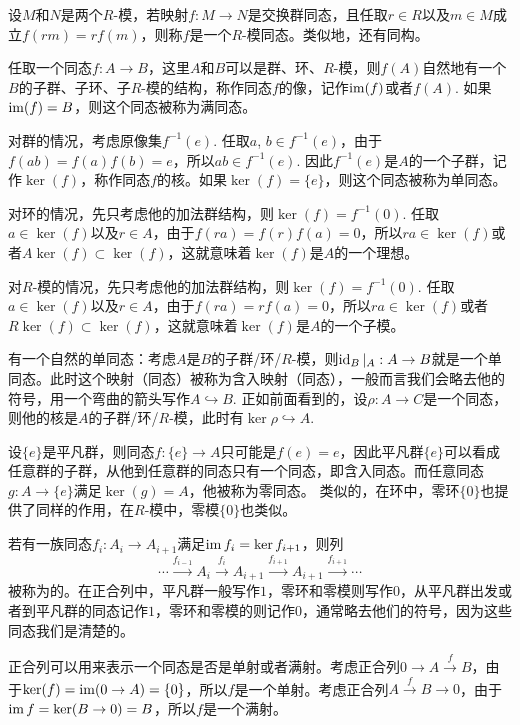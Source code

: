 设$M$和$N$是两个$R$-模，若映射$f:M\to N$是交换群同态，且任取$r\in R$以及$m\in M$成立$f(rm)=rf(m)$，则称$f$是一个$R$-模同态。类似地，还有同构。

\para[像与核] 任取一个同态$f:A\to B$，这里$A$和$B$可以是群、环、$R$-模，则$f(A)$自然地有一个$B$的子群、子环、子$R$-模的结构，称作同态$f$的像，记作$\operatorname{im}(f)$或者$f(A)$. 如果$\operatorname{im}(f)=B$，则这个同态被称为满同态。\endpara

对群的情况，考虑原像集$f^{-1}(e)$. 任取$a$, $b\in f^{-1}(e)$，由于$f(ab)=f(a)f(b)=e$，所以$ab\in f^{-1}(e)$. 因此$f^{-1}(e)$是$A$的一个子群，记作$\ker(f)$，称作同态$f$的核。如果$\ker(f)=\{e\}$，则这个同态被称为单同态。

对环的情况，先只考虑他的加法群结构，则$\ker(f)=f^{-1}(0)$. 任取$a\in \ker(f)$以及$r\in A$，由于$f(ra)=f(r)f(a)=0$，所以$ra\in \ker(f)$或者$A\ker(f)\subset \ker(f)$，这就意味着$\ker(f)$是$A$的一个理想。

对$R$-模的情况，先只考虑他的加法群结构，则$\ker(f)=f^{-1}(0)$. 任取$a\in \ker(f)$以及$r\in A$，由于$f(ra)=rf(a)=0$，所以$ra\in \ker(f)$或者$R\ker(f)\subset \ker(f)$，这就意味着$\ker(f)$是$A$的一个子模。

\para[含入] 有一个自然的单同态：考虑$A$是$B$的子群/环/$R$-模，则$\operatorname{id}_B|_A:A\to B$就是一个单同态。此时这个映射（同态）被称为含入映射（同态），一般而言我们会略去他的符号，用一个弯曲的箭头写作$A\hookrightarrow B$. 正如前面看到的，设$\rho:A\to C$是一个同态，则他的核是$A$的子群/环/$R$-模，此时有$\ker\rho\hookrightarrow A$. \endpara

\begin{para}[零同态]
	设$\{e\}$是平凡群，则同态$f:\{e\}\to A$只可能是$f(e)=e$，因此平凡群$\{e\}$可以看成任意群的子群，从他到任意群的同态只有一个同态，即含入同态。而任意同态$g:A\to \{e\}$满足$\ker(g)=A$，他被称为零同态。 类似的，在环中，零环$\{0\}$也提供了同样的作用，在$R$-模中，零模$\{0\}$也类似。
\end{para}

\para[正合列] 若有一族同态$f_i:A_i\to A_{i+1}$满足$\operatorname{im} f_i=\ker f_{i+1}$，则列
\[
	\cdots \xrightarrow{f_{i-1}}A_i \xrightarrow{f_i} A_{i+1} \xrightarrow{f_{i+1}} A_{i+1}\xrightarrow{f_{i+1}}\cdots
\]
被称为的。在正合列中，平凡群一般写作$1$，零环和零模则写作$0$，从平凡群出发或者到平凡群的同态记作$1$，零环和零模的则记作$0$，通常略去他们的符号，因为这些同态我们是清楚的。\endpara

正合列可以用来表示一个同态是否是单射或者满射。考虑正合列$0\to A\xrightarrow{f} B$，由于$\ker(f)=\operatorname{im}(0\to A)=\{0\}$，所以$f$是一个单射。考虑正合列$A\xrightarrow{f} B\to 0$，由于$\operatorname{im} f=\ker(B\to 0)=B$，所以$f$是一个满射。

